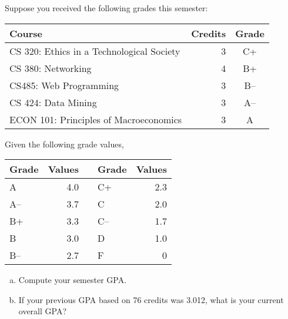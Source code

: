 \documentclass[11pt,letterpaper]{article}
\begin{document}
\newpage



 Suppose you received the following grades this semester: \par
	\begin{table}[h]
	\centering
	\begin{tabular}{lrc}
	Course & Credits & Grade \\ \hline
	CS 320: Ethics in a Technological Society & 3 & C+ \\
	CS 380: Networking & 4 & B+ \\
	CS485: Web Programming & 3 & B-- \\
	CS 424: Data Mining & 3 & A-- \\
	ECON 101: Principles of Macroeconomics & 3 & A\phantom{--}
	\end{tabular}
	\end{table} \par
Given the following grade values, 
	\begin{table}[h]
	\centering
	\begin{tabular}{lrclr}
	Grade & Values & & Grade & Values \\ \hline
	A & 4.0 & \hspace{1cm} & C+ & 2.3 \\
	A-- & 3.7 & & C & 2.0 \\
	B+ & 3.3 & & C-- & 1.7 \\
	B & 3.0 & & D & 1.0 \\
	B-- & 2.7 & & F & 0
	\end{tabular}
	\end{table}

\begin{enumerate}[(a)]
\item Compute your semester GPA. 
\item If your previous GPA based on 76 credits was 3.012, what is your current overall GPA?
\end{enumerate}
\end{document}
